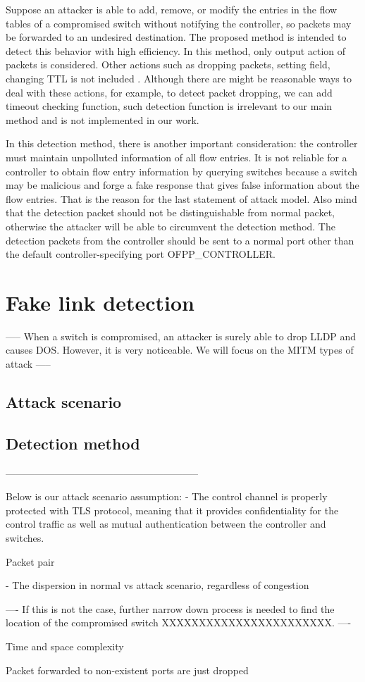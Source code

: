 Suppose an attacker is able to add, remove, or modify the entries in the flow tables of a compromised
switch without notifying the controller, so packets may be forwarded to an undesired destination. The proposed method is intended to detect this behavior with high efficiency. In this method, only output action of packets is considered. Other actions such as dropping packets, setting field, changing TTL is not included \sout{}. Although there are might be reasonable ways to deal with these actions, for example, to detect packet dropping, we can add timeout checking function, such detection function is irrelevant to our main method and is not implemented in our work.

In this detection method, there is another important consideration: the controller must maintain unpolluted information of all flow entries. It is not reliable for a controller to obtain flow entry information by querying switches because a switch may be malicious and forge a fake response that gives false information about the flow entries. That is the reason for the last statement of attack model. Also mind that the detection packet should not be distinguishable from normal packet, otherwise the attacker will be able to circumvent the detection method. The detection packets from the controller should be sent to a normal port other than the default controller-specifying port OFPP\_CONTROLLER. 

\section{Fake link detection}

-----
When a switch is compromised, an attacker is surely able to drop LLDP and causes DOS. However, it is very noticeable. We will focus on the MITM types of attack
-----
\subsection{Attack scenario}
\subsection{Detection method}


-----------------------------------------------------------

Below is our attack scenario assumption: 
- The control channel is properly protected with TLS protocol, meaning
that it provides confidentiality for the control traffic as well as mutual
authentication between the controller and switches.

Packet pair

- The dispersion in normal vs attack scenario, regardless of congestion

----
If this is not the case, further narrow down process is needed to find the location of the compromised switch XXXXXXXXXXXXXXXXXXXXXXX.
----

Time and space complexity


Packet forwarded to non-existent ports are just dropped
